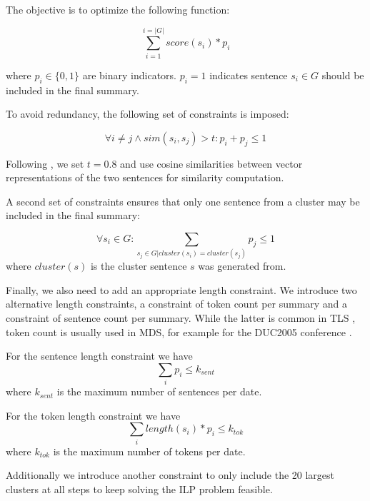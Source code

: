 \documentclass[a4paper,BCOR=10mm]{report}
\numberwithin{lemma}{chapter}
\numberwithin{definition}{chapter}
\begin{document}
The objective is to optimize the following function:

\begin{equation}
\sum_{i = 1}^{i = |G|} \mathit{score}(s_i) * p_i
\end{equation}

where $p_i \in \{0, 1\}$ are binary indicators. $p_i = 1$ indicates sentence $s_i \in G$ should be included in the final summary.

To avoid redundancy, the following set of constraints is imposed:

\begin{equation}
\forall i \neq j \land \mathit{sim}(s_i, s_j) > t : p_i + p_{j} \leq 1
\end{equation}

Following \citet{banerjee}, we set $t = 0.8$ and use cosine similarities between vector representations of the two sentences for similarity computation.

A second set of constraints ensures that only one sentence from a cluster may be included in the final summary:

\begin{equation}
\forall s_i \in G: \sum_{s_j \in G | \mathit{cluster}(s_i) = \mathit{cluster}(s_j)} p_j \leq 1
\end{equation}
where $\mathit{cluster}(s)$ is the cluster sentence $s$ was generated from.

Finally, we also need to add an appropriate length constraint.
We introduce two alternative length constraints, a constraint of token count per summary and a constraint of sentence count per summary.
While the latter is common in TLS \citep{markert, yan-trans}, token count is usually used in MDS, for example for the DUC2005 conference \citep{duc2005}.

For the sentence length constraint we have
\begin{equation}
\sum_{i} p_i \leq k_{sent}
\end{equation}
where $k_{sent}$ is the maximum number of sentences per date.

For the token length constraint we have
\begin{equation}
\sum_{i} \mathit{length}(s_i) * p_i \leq k_{tok}
\end{equation}
where $k_{tok}$ is the maximum number of tokens per date.


Additionally we introduce another constraint to only include the 20 largest clusters at all steps to keep solving the ILP problem feasible.
\end{document}
